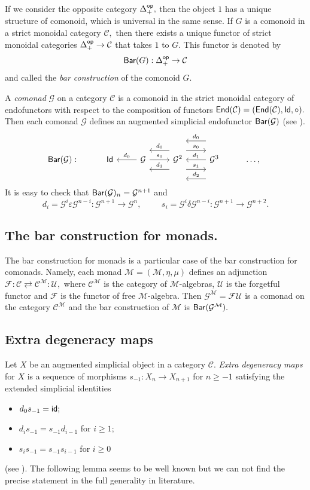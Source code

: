\documentclass{amsart}
\numberwithin{equation}{section}
\theoremstyle{definition}
\def\CC{\mathcal{C}}
\def\FF{\mathcal{F}}
\def\GG{\mathcal{G}}
\def\UU{\mathcal{U}}
\def\MM{\mathcal{M}}
\begin{document}
If we consider the opposite category $\Delta_+^{\sf op},$ then the object $1$ has a unique structure of comonoid, which is universal in the same sense. If $G$ is a comonoid in a strict monoidal category $\CC,$ then there exists a unique functor of strict monoidal categories  $\Delta_+^{\sf op}\to \CC$ that takes $1$ to $G.$ This functor is denoted by 
$${\sf Bar}(G):\Delta_+^{\sf op}\to \CC$$
and called the \emph{bar construction} of the comonoid $G.$ 

A \emph{comonad} $\GG$ on a category $\CC$ is a comonoid in the strict  monoidal category of endofunctors with respect to the composition of functors ${\sf End}(\CC)=({\sf End}(\CC),{\sf Id},\circ).$ Then each comonad $\GG$ defines an augmented  simplicial endofunctor ${\sf Bar}(\GG)$ (see \cite{barr1969homology}).  
$${\sf Bar}(\GG) : \hspace{1cm}
\begin{tikzcd} {\sf Id} & \arrow{l}[swap]{d_0} 
\GG  \arrow{r}{s_0} 
& \GG^2  \arrow[shift left=4mm]{l}[swap]{d_1} \arrow[shift left=-4mm]{l}[swap]{d_0} 
\arrow[shift left=4mm]{r}{s_0} \arrow[shift left=-4mm]{r}{s_1}
& \GG^3   \arrow[shift left=8mm]{l}[swap]{d_2} \arrow{l}[swap]{d_1} \arrow[shift left=-8mm]{l}[swap]{d_0} 
& \dots,
\end{tikzcd}
$$
It is easy to check that
 ${\sf Bar}(\GG)_n=\GG^{n+1}$ and 
$$ d_i=\GG^i \varepsilon  \GG^{n-i}: \GG^{n+1} \to \GG^n, \hspace{1cm} s_i=\GG^i \delta  \GG^{n-i}:\GG^{n+1} \to \GG^{n+2}.$$

\subsection{The bar construction for monads.}  The bar construction for monads is a particular case of the bar construction for comonads. Namely, each monad $\MM=(\MM,\eta,\mu)$ defines an adjunction $\FF:\CC \rightleftarrows \CC^\MM : \UU,$ where $\CC^\MM$ is the category of $\MM$-algebras, $\UU$ is the forgetful functor and $\FF$ is the functor of free $\MM$-algebra. Then  $\GG^\MM=\FF\UU$ is a comonad on the category $\CC^\MM$ and the bar construction of $\MM$ is ${\sf Bar}(\GG^\MM).$ 

\subsection{Extra degeneracy maps} Let $X$ be an augmented simplicial object in a category $\CC.$ {\it Extra degeneracy maps} for $X$ is a sequence of morphisms $s_{-1}:X_n\to X_{n+1}$ for $n\geq -1$ satisfying the extended simplicial identities 
\begin{itemize}
\item $d_0s_{-1}={\sf id};$
\item $d_is_{-1}=s_{-1}d_{i-1}$  for $i\geq 1;$
\item $s_{i}s_{-1}=s_{-1}s_{i-1}$ for $i\geq 0$ 
\end{itemize}
(see \cite{barr2019contractible}). The following lemma seems to be well known but we can not find the precise statement in the full generality in literature. 
\end{document}
